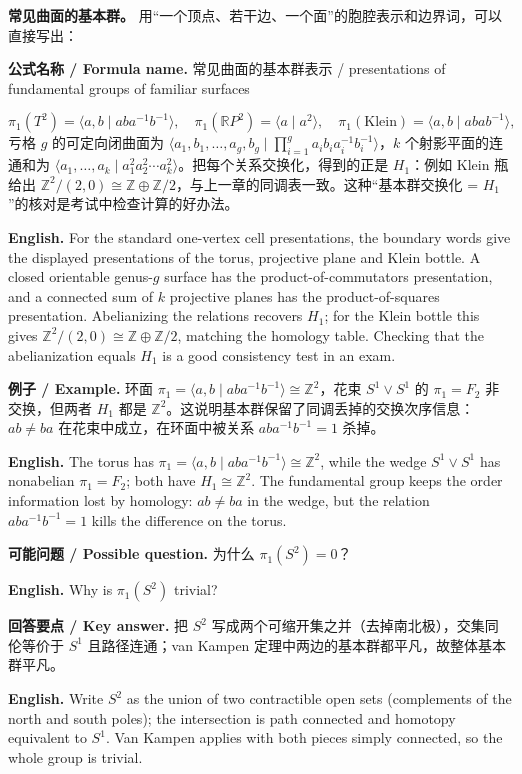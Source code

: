 \documentclass[UTF8,11pt,a4paper]{ctexart}
\newcommand{\EN}[1]{\par\noindent\textbf{English.} #1\par}
\newcommand{\FORMULA}[2]{\par\noindent\textbf{公式名称 / Formula name.} #1 / #2\par}
\newcommand{\EX}[2]{\par\noindent\textbf{例子 / Example.} #1\par\EN{#2}}
\newcommand{\ASK}[4]{\par\noindent\textbf{可能问题 / Possible question.} #1\par\EN{#2}\noindent\textbf{回答要点 / Key answer.} #3\par\EN{#4}\medskip}
\begin{document}
\noindent\textbf{常见曲面的基本群。} 用“一个顶点、若干边、一个面”的胞腔表示和边界词，可以直接写出：
\FORMULA{常见曲面的基本群表示}{presentations of fundamental groups of familiar surfaces}
\[
\pi_1(T^2)=\langle a,b\mid aba^{-1}b^{-1}\rangle,\quad
\pi_1(\mathbb R P^2)=\langle a\mid a^2\rangle,\quad
\pi_1(\text{Klein})=\langle a,b\mid abab^{-1}\rangle,
\]
亏格 $g$ 的可定向闭曲面为 $\langle a_1,b_1,\ldots,a_g,b_g\mid\prod_{i=1}^g a_ib_ia_i^{-1}b_i^{-1}\rangle$，$k$ 个射影平面的连通和为 $\langle a_1,\ldots,a_k\mid a_1^2a_2^2\cdots a_k^2\rangle$。把每个关系交换化，得到的正是 $H_1$：例如 Klein 瓶给出 $\mathbb Z^2/(2,0)\cong\mathbb Z\oplus\mathbb Z/2$，与上一章的同调表一致。这种“基本群交换化 = $H_1$”的核对是考试中检查计算的好办法。
\EN{For the standard one-vertex cell presentations, the boundary words give the displayed presentations of the torus, projective plane and Klein bottle. A closed orientable genus-$g$ surface has the product-of-commutators presentation, and a connected sum of $k$ projective planes has the product-of-squares presentation. Abelianizing the relations recovers $H_1$; for the Klein bottle this gives $\mathbb Z^2/(2,0)\cong\mathbb Z\oplus\mathbb Z/2$, matching the homology table. Checking that the abelianization equals $H_1$ is a good consistency test in an exam.}

\EX{环面 $\pi_1=\langle a,b\mid aba^{-1}b^{-1}\rangle\cong\mathbb Z^2$，花束 $S^1\vee S^1$ 的 $\pi_1=F_2$ 非交换，但两者 $H_1$ 都是 $\mathbb Z^2$。这说明基本群保留了同调丢掉的交换次序信息：$ab\ne ba$ 在花束中成立，在环面中被关系 $aba^{-1}b^{-1}=1$ 杀掉。}{The torus has $\pi_1=\langle a,b\mid aba^{-1}b^{-1}\rangle\cong\mathbb Z^2$, while the wedge $S^1\vee S^1$ has nonabelian $\pi_1=F_2$; both have $H_1\cong\mathbb Z^2$. The fundamental group keeps the order information lost by homology: $ab\ne ba$ in the wedge, but the relation $aba^{-1}b^{-1}=1$ kills the difference on the torus.}

\ASK{为什么 $\pi_1(S^2)=0$？}{Why is $\pi_1(S^2)$ trivial?}{把 $S^2$ 写成两个可缩开集之并（去掉南北极），交集同伦等价于 $S^1$ 且路径连通；van Kampen 定理中两边的基本群都平凡，故整体基本群平凡。}{Write $S^2$ as the union of two contractible open sets (complements of the north and south poles); the intersection is path connected and homotopy equivalent to $S^1$. Van Kampen applies with both pieces simply connected, so the whole group is trivial.}
\end{document}
